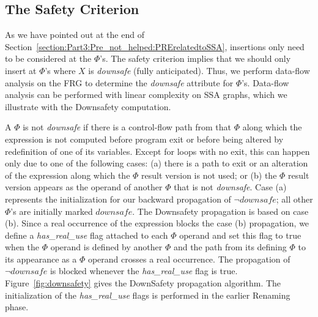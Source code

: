 \subsection{The Safety Criterion}

As we have pointed out at the end of 
Section~\ref{section:Part3:Pre_not_helped:PRErelatedtoSSA},
insertions only need to be considered at the $\Phi$'s.
The safety criterion implies that we should only insert at $\Phi$'s where $X$ 
is \emph{downsafe} (fully anticipated).  Thus, we perform data-flow analysis on
the FRG to determine the \emph{downsafe} attribute for $\Phi$'s.
Data-flow analysis can be performed with linear complexity on SSA graphs, which
we illustrate with the Downsafety computation.

A $\Phi$ is not \emph{downsafe} if there is a control-flow path from that 
$\Phi$ along which the expression is not computed before program exit or 
before 
being altered by redefinition of one of its variables.  Except for loops with
no exit, this can happen only due to one of the following cases: (a) there
is a path to exit or an alteration of the expression
along which the $\Phi$ result version is not used; or (b) the $\Phi$ result
version appears as the operand of another $\Phi$ that is not \emph{downsafe}.
Case (a) represents the initialization for our backward propagation of 
$\neg downsafe$; all other $\Phi$'s are initially marked $downsafe$.
The Downsafety propagation is based on case (b).  Since a real occurrence of 
the expression blocks the case (b) propagation, we define a 
\emph{has\_real\_use} flag attached to each $\Phi$ operand and set this flag to
true when the $\Phi$ operand is defined by another $\Phi$ and the path from its
defining $\Phi$ to its appearance as a $\Phi$ operand crosses a real occurrence.
The propagation of $\neg downsafe$ is blocked whenever the \emph{has\_real\_use}
flag is true.  Figure~\ref{fig:downsafety} gives the DownSafety propagation
algorithm.  The initialization of the \emph{has\_real\_use}
flags is performed in the earlier Renaming phase.

